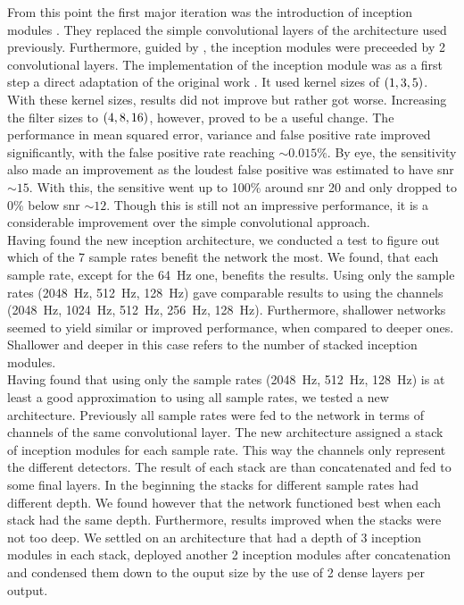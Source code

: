 From this point the first major iteration was the introduction of inception modules \cite{inception_module}. They replaced the simple convolutional layers of the architecture used previously.
 Furthermore, guided by \cite{inception_module}, the inception modules were preceeded by 2 convolutional layers. The implementation of the inception module was as a first step a direct adaptation of the original work \cite{inception_module}. It used kernel sizes of ${\left( 1,3,5 \right)}$. With these kernel sizes, results did not improve but rather got worse. Increasing the filter sizes to ${\left( 4,8,16 \right)}$, however, proved to be a useful change. The performance in mean squared error, variance and false positive rate improved significantly, with the false positive rate reaching $\sim 0.015\%$. By eye, the sensitivity also made an improvement as the loudest false positive was estimated to have \gls{snr} $\sim 15$. With this, the sensitive went up to 100\% around \gls{snr} 20 and only dropped to 0\% below \gls{snr} $\sim 12$. Though this is still not an impressive performance, it is a considerable improvement over the simple convolutional approach.\medskip\\
Having found the new inception architecture, we conducted a test to figure out which of the 7 sample rates benefit the network the most.
 We found, that each sample rate, except for the \SI{64}{\hertz} one, benefits the results. Using only the sample rates (\SI{2048}{\hertz}, \SI{512}{\hertz}, \SI{128}{\hertz}) gave comparable results to using the channels (\SI{2048}{\hertz}, \SI{1024}{\hertz}, \SI{512}{\hertz}, \SI{256}{\hertz}, \SI{128}{\hertz}). Furthermore, shallower networks seemed to yield similar or improved performance, when compared to deeper ones. Shallower and deeper in this case refers to the number of stacked inception modules.\medskip\\
Having found that using only the sample rates (\SI{2048}{\hertz}, \SI{512}{\hertz}, \SI{128}{\hertz}) is at least a good approximation to using all sample rates, we tested a new architecture. Previously all sample rates were fed to the network in terms of channels of the same convolutional layer. The new architecture assigned a stack of inception modules for each sample rate. This way the channels only represent the different detectors. The result of each stack are than concatenated and fed to some final layers. In the beginning the stacks for different sample rates had different depth. We found however that the network functioned best when each stack had the same depth. Furthermore, results improved when the stacks were not too deep. We settled on an architecture that had a depth of 3 inception modules in each stack, deployed another 2 inception modules after concatenation and condensed them down to the ouput size by the use of 2 dense layers per output.\\
